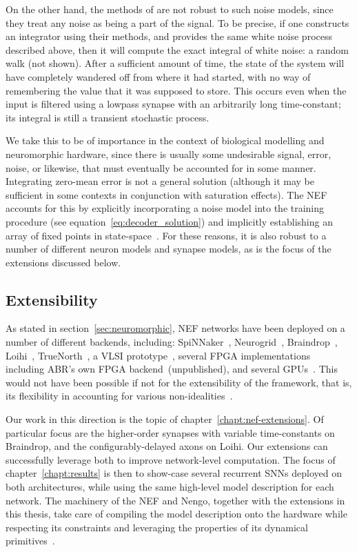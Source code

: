 On the other hand, the methods of \citet{boerlin2013predictive} are not robust to such noise models, since they treat any noise as being a part of the signal.
To be precise, if one constructs an integrator using their methods, and provides the same white noise process described above, then it will compute the exact integral of white noise: a random walk (not shown).
After a sufficient amount of time, the state of the system will have completely wandered off from where it had started, with no way of remembering the value that it was supposed to store.
This occurs even when the input is filtered using a lowpass synapse with an arbitrarily long time-constant; its integral is still a transient stochastic process.

We take this to be of importance in the context of biological modelling and neuromorphic hardware, since there is usually some undesirable signal, error, noise, or likewise, that must eventually be accounted for in some manner.
Integrating zero-mean error is not a general solution (although it may be sufficient in some contexts in conjunction with saturation effects).
The NEF accounts for this by explicitly incorporating a noise model into the training procedure (see equation~\ref{eq:decoder_solution}) and implicitly establishing an array of fixed points in state-space~\citep[][p.~237]{eliasmith2003a}.
For these reasons, it is also robust to a number of different neuron models and synapse models, as is the focus of the extensions discussed below.

\subsection{Extensibility}
\label{sec:nef-extensibility}

As stated in section~\ref{sec:neuromorphic}, NEF networks have been deployed on a number of different backends, including:
SpiNNaker~\citep{mundy2015},
Neurogrid~\citep{choudhary2012silicon},
Braindrop~\citep{braindrop2019},
Loihi~\citep{davies2018loihi},
TrueNorth~\citep{fischl2018},
a VLSI prototype~\citep{corradi2014},
several FPGA implementations~\citep{naylor2013managing, wang2014compact, berzish2016, wang2017neuromorphic} including ABR's own FPGA backend~(unpublished),
and several GPUs~\citep{bekolay2014, rasmussen2018nengodl, blouw2018a}.
This would not have been possible if not for the extensibility of the framework, that is, its flexibility in accounting for various non-idealities~\citep[e.g.,~][]{voelker2017iscas}.

Our work in this direction is the topic of chapter~\ref{chapt:nef-extensions}.
Of particular focus are the higher-order synapses with variable time-constants on Braindrop, and the configurably-delayed axons on Loihi.
Our extensions can successfully leverage both to improve network-level computation.
The focus of chapter~\ref{chapt:results} is then to show-case several recurrent SNNs deployed on both architectures, while using the same high-level model description for each network.
The machinery of the NEF and Nengo, together with the extensions in this thesis, take care of compiling the model description onto the hardware while respecting its constraints and leveraging the properties of its dynamical primitives~\citep{braindrop2019}.

